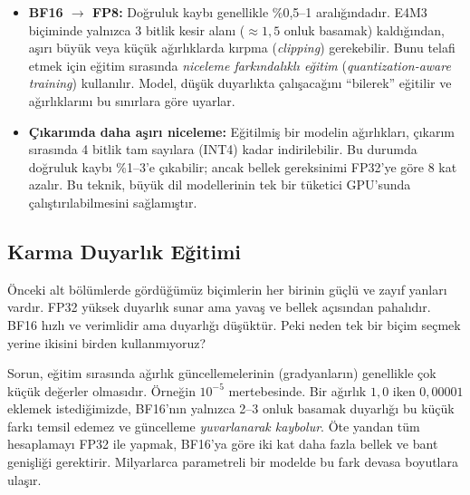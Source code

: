 \begin{itemize}
\begin{figure}[htbp]
\caption[Farklı yapay zeka modellerinin ağırlık dağılımları]{Farklı yapay zeka modellerinin tipik ağırlık dağılımları. Tüm modellerde ağırlıklar sıfır etrafında çan eğrisi biçiminde yoğunlaşır; CNN modelleri (ResNet) daha dar, Transformer modelleri (GPT, BERT) daha geniş kuyruklu dağılım gösterir. Bu yoğunlaşma, düşük bitli kayan nokta biçimlerinin yeterli duyarlık sağlayabilmesinin temel nedenidir.}
\label{fig:agirlik-dagilimi}
\end{figure}
\item \textbf{BF16 $\rightarrow$ FP8:} Doğruluk kaybı genellikle \%0{,}5--1 aralığındadır. E4M3 biçiminde yalnızca 3 bitlik kesir alanı ($\approx 1{,}5$ onluk basamak) kaldığından, aşırı büyük veya küçük ağırlıklarda kırpma (\emph{clipping}) gerekebilir. Bunu telafi etmek için eğitim sırasında \emph{niceleme farkındalıklı eğitim} (\emph{quantization-aware training}) kullanılır. Model, düşük duyarlıkta çalışacağını ``bilerek'' eğitilir ve ağırlıklarını bu sınırlara göre uyarlar.
\item \textbf{Çıkarımda daha aşırı niceleme:} Eğitilmiş bir modelin ağırlıkları, çıkarım sırasında 4 bitlik tam sayılara (INT4) kadar indirilebilir. Bu durumda doğruluk kaybı \%1--3'e çıkabilir; ancak bellek gereksinimi FP32'ye göre 8 kat azalır. Bu teknik, büyük dil modellerinin tek bir tüketici GPU'sunda çalıştırılabilmesini sağlamıştır.
\end{itemize}

\subsection{Karma Duyarlık Eğitimi}

Önceki alt bölümlerde gördüğümüz biçimlerin her birinin güçlü ve zayıf yanları vardır. FP32 yüksek duyarlık sunar ama yavaş ve bellek açısından pahalıdır. BF16 hızlı ve verimlidir ama duyarlığı düşüktür. Peki neden tek bir biçim seçmek yerine ikisini birden kullanmıyoruz?

Sorun, eğitim sırasında ağırlık güncellemelerinin (gradyanların) genellikle çok küçük değerler olmasıdır. Örneğin $10^{-5}$ mertebesinde. Bir ağırlık $1{,}0$ iken $0{,}00001$ eklemek istediğimizde, BF16'nın yalnızca 2--3 onluk basamak duyarlığı bu küçük farkı temsil edemez ve güncelleme \emph{yuvarlanarak kaybolur}. Öte yandan tüm hesaplamayı FP32 ile yapmak, BF16'ya göre iki kat daha fazla bellek ve bant genişliği gerektirir. Milyarlarca parametreli bir modelde bu fark devasa boyutlara ulaşır.

